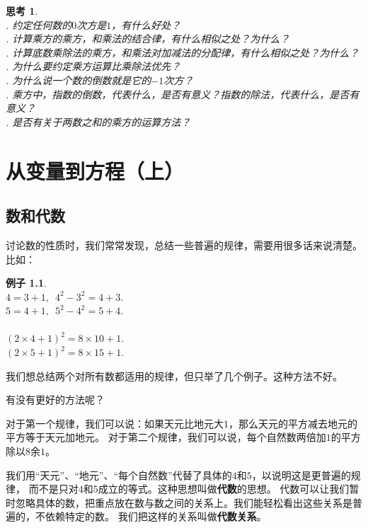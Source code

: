 \documentclass[12pt,UTF8]{ctexbook}
\newtheorem{ex}{例子}[section]
\newtheorem{sk}{思考}[section]
\begin{document}
\begin{sk}\label{sk:0-2-0}
    \mbox{}\\
    . 约定任何数的$0$次方是$1$，有什么好处？\\
    . 计算乘方的乘方，和乘法的结合律，有什么相似之处？为什么？\\
    . 计算底数乘除法的乘方，和乘法对加减法的分配律，有什么相似之处？为什么？\\
    . 为什么要约定乘方运算比乘除法优先？\\
    . 为什么说一个数的倒数就是它的$-1$次方？\\
    . 乘方中，指数的倒数，代表什么，是否有意义？指数的除法，代表什么，是否有意义？\\
    . 是否有关于两数之和的乘方的运算方法？
\end{sk}

\chapter{从变量到方程（上）}

\section{数和代数}
讨论数的性质时，我们常常发现，总结一些普遍的规律，需要用很多话来说清楚。比如：
\begin{ex}\label{ex:1-0-0}
    \mbox{} \\ 
    \indent $4 = 3 + 1,\,\,\, 4^2 - 3^2 = 4 + 3.$ \\
    \indent $5 = 4 + 1, \,\,\,5^2 - 4^2 = 5 + 4.$\\
    \mbox{}\\
    \indent $(2 \times 4 + 1)^2 = 8 \times 10 + 1.$\\
    \indent $(2 \times 5 + 1)^2 = 8 \times 15 + 1.$
\end{ex}
我们想总结两个对所有数都适用的规律，但只举了几个例子。这种方法不好。

有没有更好的方法呢？

对于第一个规律，我们可以说：如果天元比地元大$1$，那么天元的平方减去地元的平方等于天元加地元。
对于第二个规律，我们可以说，每个自然数两倍加$1$的平方除以$8$余$1$。

我们用“天元”、“地元”、“每个自然数”代替了具体的$4$和$5$，以说明这是更普遍的规律，
而不是只对$4$和$5$成立的等式。这种思想叫做\textbf{代数}的思想。
代数可以让我们暂时忽略具体的数，把重点放在数与数之间的关系上。我们能轻松看出这些关系是普遍的，不依赖特定的数。
我们把这样的关系叫做\textbf{代数关系}。
\end{document}
